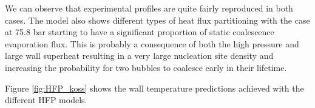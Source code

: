 \npar

We can observe that experimental profiles are quite fairly reproduced in both cases. The model also shows different types of heat flux partitioning with the case at 75.8 bar starting to have a significant proportion of static coalescence evaporation flux. This is probably a consequence of both the high pressure and large wall superheat resulting in a very large nucleation site density and increasing the probability for two bubbles to coalesce early in their lifetime.

\npar

Figure \ref{fig:HFP_koss} shows the wall temperature predictions achieved with the different HFP models.


\begin{figure}[!h]
\centering
{}
\\
\end{figure}

